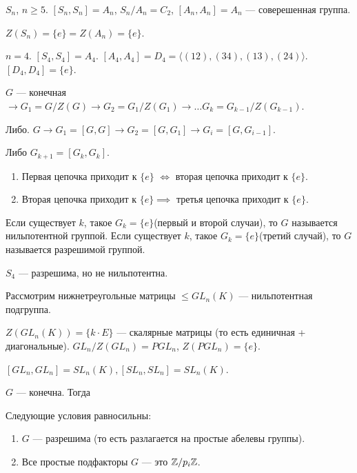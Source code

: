 \begin{example}
    $S_n$,  $n \ge 5$.
    $[S_n, S_n] = A_n$,  $S_n / A_n = C_2$,  $[A_n, A_n] = A_n$ --- соверешенная группа.

     $Z(S_n) = \{e\} = Z(A_n) = \{e\}$.

     $n = 4$.  $[S_4, S_4] = A_4$.  $[A_4, A_4] = D_4 = \langle (12), (34), (13), (24) \rangle$. $[D_4, D_4] = \{e\}$.
\end{example}
\begin{example}
    $G$ --- конечная  $\to G_1 =G / Z(G) \to G_2 = G_1 / Z(G_1) \to \ldots G_k = G_{k-1} / Z(G_{k-1})$.

    Либо. $G \to G_1 = [G, G] \to G_2 = [G, G_1] \to G_i = [G, G_{i-1}]$.

    Либо $G_{k+1} = [G_k, G_k]$.
\end{example}
\begin{statement}
    \begin{enumerate}
        \item Первая цепочка приходит к $\{e\}$ $\iff$ вторая цепочка приходит к $\{e\}$.
        \item Вторая цепочка приходит к $\{e\} \implies$ третья цепочка приходит к  $\{e\}$.
    \end{enumerate}

    Если существует $k$, такое  $G_k = \{e\}$(первый и второй случаи), то  $G$ называется нильпотентной группой. 
    Если существует $k$, такое  $G_k = \{e\}$(третий случай), то  $G$ называется разрешимой группой. 
\end{statement}
\begin{example}
    $S_4$ --- разрешима, но не нильпотентна. 
\end{example}
\begin{example}
    Рассмотрим нижнетреугольные матрицы $\le GL_n(K)$  --- нильпотентная подгруппа.

    $Z(GL_n(K)) = \{k\cdot E\}$ --- скалярные матрицы (то есть единичная + диагональные).  $GL_n / Z(GL_n) = PGL_n$,  $Z(PGL_n) = \{e\}$.

     $[GL_n, GL_n] = SL_n(K), [SL_n, SL_n] = SL_n(K)$.
\end{example}
\begin{theorem}
    $G$ --- конечна. Тогда

    Следующие условия равносильны: 
    \begin{enumerate}
        \item $G$ --- разрешима (то есть разлагается на простые абелевы группы).
        \item Все простые подфакторы $G$ --- это  $\mathbb{Z} / p_i \mathbb{Z}$.
    \end{enumerate}
\end{theorem}
